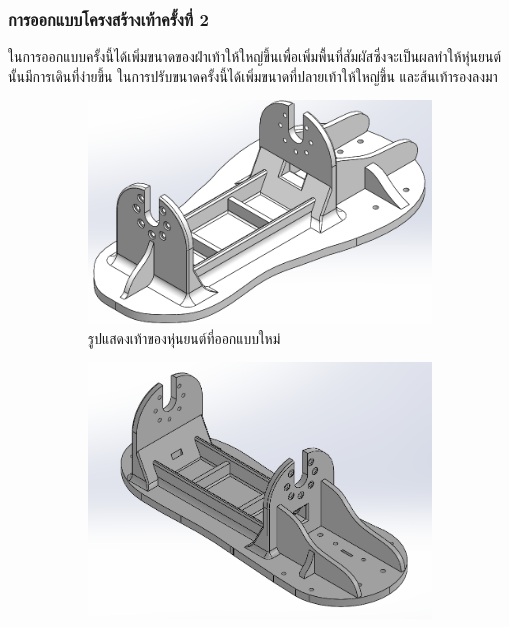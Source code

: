 \clearpage
\subsubsection{การออกแบบโครงสร้างเท้าครั้งที่ 2}
ในการออกแบบครั้งนี้ได้เพิ่มขนาดของฝ่าเท้าให้ใหญ่ขึ้นเพื่อเพิ่มพื้นที่สัมผัสซึ่งจะเป็นผลทำให้หุ่นยนต์นั้นมีการเดินที่ง่ายขึ้น
ในการปรับขนาดครั้งนี้ได้เพิ่มขนาดที่ปลายเท้าให้ใหญ่ขึ้น และส้นเท้ารองลงมา
\begin{figure}[!ht]
  \centering
  \begin{subfigure}[b]{0.41\linewidth}
    \includegraphics[width=\linewidth]{chapter4/images/foot_new.PNG}
    \caption{รูปแสดงเท้าของหุ่นยนต์ที่ออกแบบใหม่}
  \end{subfigure}
  \begin{subfigure}[b]{0.4\linewidth}
    \includegraphics[width=\linewidth]{chapter4/images/foot_old.PNG}

\end{subfigure}
\end{figure}
